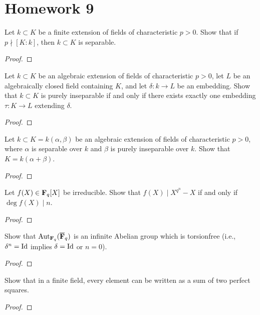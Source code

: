 \chapter{Homework 9}
\begin{problem}
Let $k\subset K$ be a finite extension of fields of characteristic
$p>0$. Show that if $p\nmid [K:k]$, then $k\subset K$ is separable.
\end{problem}
\begin{proof}
\end{proof}

\begin{problem}
Let $k\subset K$ be an algebraic extension of fields of characteristic
$p>0$, let $L$ be an algebraically closed field containing $K$, and let
$\delta\colon k\to L$ be an embedding. Show that $k\subset K$ is purely
inseparable if and only if there exists exactly one embedding $\tau\colon
K\to L$ extending $\delta$.
\end{problem}
\begin{proof}
\end{proof}

\begin{problem}
Let $k\subset K=k(\alpha,\beta)$ be an algebraic extension of fields of
characteristic $p>0$, where $\alpha$ is separable over $k$ and $\beta$ is
purely inseparable over $k$. Show that $K=k(\alpha+\beta)$.
\end{problem}
\begin{proof}
\end{proof}

\begin{problem}
Let $f(X)\in\mathbf{F}_q[X]$ be irreducible. Show that $f(X)\mid X^{q^n}-X$ if
and only if $\deg f(X)\mid n$.
\end{problem}
\begin{proof}
\end{proof}

\begin{problem}
Show that $\operatorname{Aut}_{\mathbf{F}_q}(\overline{\mathbf{F}}_q)$ is an infinite Abelian group
which is torsionfree (i.e., $\delta^n=\operatorname{Id}$ implies $\delta=\operatorname{Id}$ or $n=0$).
\end{problem}
\begin{proof}
\end{proof}

\begin{problem}
Show that in a finite field, every element can be written as a sum of two
perfect squares.
\end{problem}
\begin{proof}
\end{proof}

